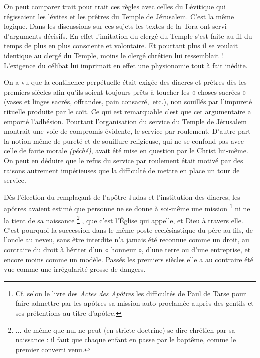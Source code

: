 On peut comparer trait pour trait ces règles avec celles du Lévitique qui régissaient les lévites et les prêtres du Temple de Jérusalem. C'est la même logique. Dans les discussions sur ces sujets les textes de la Tora ont servi d'arguments décisifs. En effet l'imitation du clergé du Temple s'est faite au fil du temps de plus en plus consciente et volontaire. Et pourtant plus il se voulait identique au clergé du Temple, moins le clergé chrétien lui ressemblait ! L'exigence du célibat lui imprimait en effet une physionomie tout à fait inédite. 

 On a vu que la continence perpétuelle était exigée des diacres et prêtres dès les premiers siècles afin qu'ils soient toujours prêts à toucher les « choses sacrées » (vases et linges sacrés, offrandes, pain consacré,~etc.), non souillés par l'impureté rituelle produite par le coït. Ce qui est remarquable c'est que cet argumentaire a emporté l'adhésion. Pourtant l'organisation du service du Temple de Jérusalem montrait une voie de compromis évidente, le service par roulement. D'autre part la notion même de pureté et de souillure religieuse, qui ne se confond pas avec celle de faute morale \emph{(péché)}, avait été mise en question par le Christ lui-même. On peut en déduire que le refus du service par roulement était motivé par des raisons autrement impérieuses que la difficulté de mettre en place un tour de service. 

 Dès l'élection du remplaçant de l'apôtre Judas et l'institution des diacres, les apôtres avaient estimé que personne ne se donne à soi-même une mission%
\footnote{Cf. selon le livre des \emph{Actes des Apôtres} les difficultés de Paul de Tarse pour faire admettre par les apôtres sa mission auto proclamée auprès des gentils et ses prétentions au titre d'apôtre.} 
ni ne la tient de sa naissance%
\footnote{... de même que nul ne peut (en stricte doctrine) se dire chrétien par sa naissance : il faut que chaque enfant en passe par le baptême, comme le premier converti venu.}%
, que c'est l'Église qui appelle, et Dieu à travers elle. C'est pourquoi la succession dans le même poste ecclésiastique du père au fils, de l'oncle au neveu, sans être interdite n'a jamais été reconnue comme un droit, au contraire du droit à hériter d'un « honneur », d'une terre ou d'une entreprise, et encore moins comme un modèle. Passés les premiers siècles elle a au contraire été vue comme une irrégularité grosse de dangers. 

